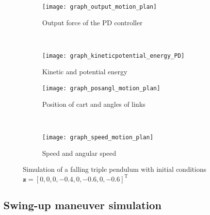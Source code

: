 \documentclass[a4paper,12pt]{article}
\begin{document}
\begin{figure}[h]
    \centering
    \begin{subfigure}[t]{0.46\textwidth}
        \centering
        \texttt{[image: graph\_output\_motion\_plan]}
        \caption{Output force of the PD controller}
    \end{subfigure}%
    ~ 
    \begin{subfigure}[t]{0.46\textwidth}
        \centering
        \texttt{[image: graph\_kineticpotential\_energy\_PD]}
        \caption{Kinetic and potential energy}
    \end{subfigure}

    \begin{subfigure}[t]{0.46\textwidth}
        \centering
        \texttt{[image: graph\_posangl\_motion\_plan]}
        \caption{Position of cart and angles of links}
    \end{subfigure}%
    ~
    \begin{subfigure}[t]{0.46\textwidth}
        \centering
        \texttt{[image: graph\_speed\_motion\_plan]}
        \caption{Speed and angular speed}
    \end{subfigure}
    \caption{Simulation of a falling triple pendulum with initial conditions $\mathbf{z} = [0,0,0,\num{-0.4},0,\num{-0.6},0,\num{-0.6}]^\text{T}$}
     \label{fig:result_gene}
\end{figure}

\subsection{Swing-up maneuver simulation}
\end{document}
